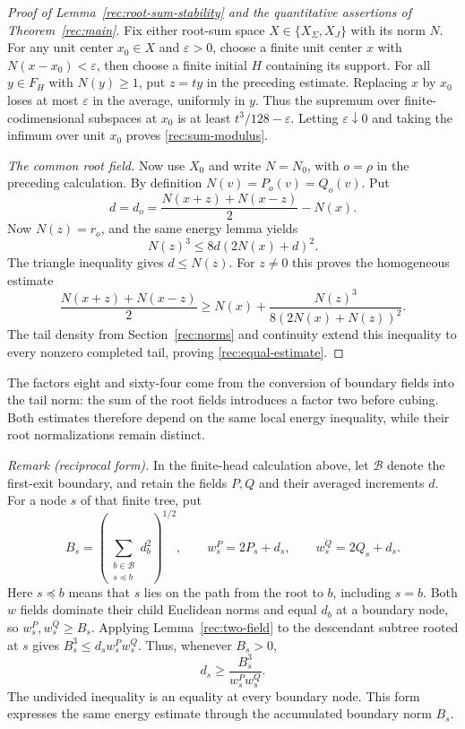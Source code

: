 \begin{proof}[Proof of Lemma~\ref{rec:root-sum-stability} and the quantitative assertions of Theorem~\ref{rec:main}]
Fix either root-sum space $X\in\{X_\Sigma,X_J\}$ with its norm $N$.
For any unit center $x_0\in X$ and $\varepsilon>0$, choose a
finite unit center $x$ with $N(x-x_0)<\varepsilon$, then choose a finite
initial $H$ containing its support. For all $y\in F_H$ with $N(y)\ge1$,
put $z=ty$ in the preceding estimate. Replacing $x$ by $x_0$ loses at
most $\varepsilon$ in the average, uniformly in $y$. Thus the supremum
over finite-codimensional subspaces at $x_0$ is at least
$t^3/128-\varepsilon$. Letting $\varepsilon\downarrow0$ and taking
the infimum over unit $x_0$ proves \eqref{rec:sum-modulus}.

\emph{The common root field.} Now use $X_0$ and write $N=N_0$,
with $o=\rho$ in the preceding calculation. By definition
$N(v)=P_o(v)=Q_o(v)$. Put
\[
 d=d_o=\frac{N(x+z)+N(x-z)}2-N(x).
\]
Now $N(z)=r_o$, and the same energy lemma yields
\[
 N(z)^3\le8d(2N(x)+d)^2.
\]
The triangle inequality gives $d\le N(z)$. For $z\ne0$ this proves the
homogeneous estimate
\[
 \frac{N(x+z)+N(x-z)}2
 \ge N(x)+\frac{N(z)^3}{8(2N(x)+N(z))^2}.
\]
The tail density from Section~\ref{rec:norms} and continuity extend
this inequality to every nonzero completed tail, proving
\eqref{rec:equal-estimate}.
\end{proof}

The factors eight and sixty-four come from the conversion of boundary
fields into the tail norm: the sum of the root fields introduces a
factor two before cubing. Both estimates therefore depend on the same
local energy inequality, while their root normalizations remain distinct.

\medskip
\noindent\emph{Remark (reciprocal form).}
In the finite-head calculation above, let $\mathcal B$ denote the
first-exit boundary, and retain the fields $P,Q$ and their averaged
increments $d$. For a node $s$ of that finite tree, put
\[
 B_s=\left(\sum_{\substack{b\in\mathcal B\\s\preceq b}}d_b^2\right)^{1/2},
 \qquad w_s^P=2P_s+d_s,\qquad w_s^Q=2Q_s+d_s.
\]
Here $s\preceq b$ means that $s$ lies on the path from the root to $b$,
including $s=b$. Both $w$ fields dominate their child Euclidean norms
and equal $d_b$ at a boundary node, so $w_s^P,w_s^Q\ge B_s$.
Applying Lemma~\ref{rec:two-field} to the descendant subtree rooted at
$s$ gives $B_s^3\le d_s w_s^P w_s^Q$. Thus, whenever $B_s>0$,
\begin{equation}\label{rec:reciprocal-energy}
 d_s\ge\frac{B_s^3}{w_s^P w_s^Q}.
\end{equation}
The undivided inequality is an equality at every boundary node.
This form expresses the same energy estimate through the accumulated
boundary norm $B_s$.
